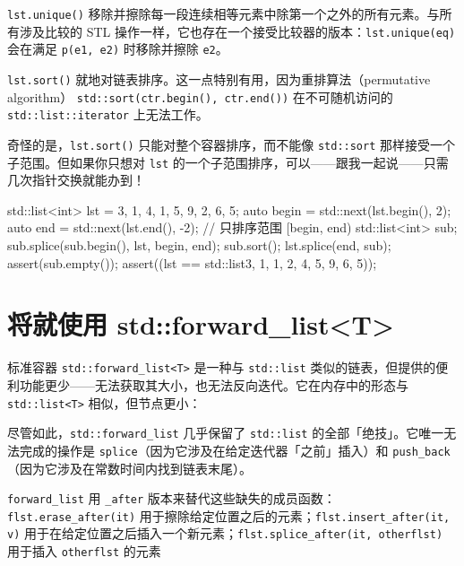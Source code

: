\texttt{lst.\allowbreak{}unique(\allowbreak{})\allowbreak{}} 移除并擦除每一段连续相等元素中除第一个之外的所有元素。与所有涉及比较的 STL 操作一样，它也存在一个接受比较器的版本：\texttt{lst.\allowbreak{}unique(\allowbreak{}eq)\allowbreak{}} 会在满足 \texttt{p(\allowbreak{}e1,\allowbreak{} e2)\allowbreak{}} 时移除并擦除 \texttt{e2}。

\texttt{lst.\allowbreak{}sort(\allowbreak{})\allowbreak{}} 就地对链表排序。这一点特别有用，因为重排算法（permutative algorithm） \texttt{std::\allowbreak{}sort(\allowbreak{}ctr.\allowbreak{}begin(\allowbreak{})\allowbreak{},\allowbreak{} ctr.\allowbreak{}end(\allowbreak{})\allowbreak{})\allowbreak{}} 在不可随机访问的 \texttt{std::\allowbreak{}list::\allowbreak{}iterator} 上无法工作。

奇怪的是，\texttt{lst.\allowbreak{}sort(\allowbreak{})\allowbreak{}} 只能对整个容器排序，而不能像 \texttt{std::\allowbreak{}sort} 那样接受一个子范围。但如果你只想对 \texttt{lst} 的一个子范围排序，可以——跟我一起说——只需几次指针交换就能办到！

\begin{codebox}[cpp]
    std::list<int> lst = {3, 1, 4, 1, 5, 9, 2, 6, 5};
    auto begin = std::next(lst.begin(), 2);
    auto end = std::next(lst.end(), -2);
    // 只排序范围 [begin, end)
    std::list<int> sub;
    sub.splice(sub.begin(), lst, begin, end);
    sub.sort();
    lst.splice(end, sub);
    assert(sub.empty());
    assert((lst == std::list{3, 1, 1, 2, 4, 5, 9, 6, 5}));
\end{codebox}

\section{将就使用 std::forward\_\allowbreak{}list<T>}

标准容器 \texttt{std::\allowbreak{}forward\_\allowbreak{}list<\allowbreak{}T>\allowbreak{}} 是一种与 \texttt{std::\allowbreak{}list} 类似的链表，但提供的便利功能更少——无法获取其大小，也无法反向迭代。它在内存中的形态与 \texttt{std::\allowbreak{}list<\allowbreak{}T>\allowbreak{}} 相似，但节点更小：


尽管如此，\texttt{std::\allowbreak{}forward\_\allowbreak{}list} 几乎保留了 \texttt{std::\allowbreak{}list} 的全部「绝技」。它唯一无法完成的操作是 \texttt{splice}（因为它涉及在给定迭代器「之前」插入）和 \texttt{push\_\allowbreak{}back}（因为它涉及在常数时间内找到链表末尾）。

\texttt{forward\_\allowbreak{}list} 用 \texttt{\_\allowbreak{}after} 版本来替代这些缺失的成员函数：\texttt{flst.\allowbreak{}erase\_\allowbreak{}after(\allowbreak{}it)\allowbreak{}} 用于擦除给定位置之后的元素；\texttt{flst.\allowbreak{}insert\_\allowbreak{}after(\allowbreak{}it,\allowbreak{} v)\allowbreak{}} 用于在给定位置之后插入一个新元素；\texttt{flst.\allowbreak{}splice\_\allowbreak{}after(\allowbreak{}it,\allowbreak{} otherflst)\allowbreak{}} 用于插入 \texttt{otherflst} 的元素

